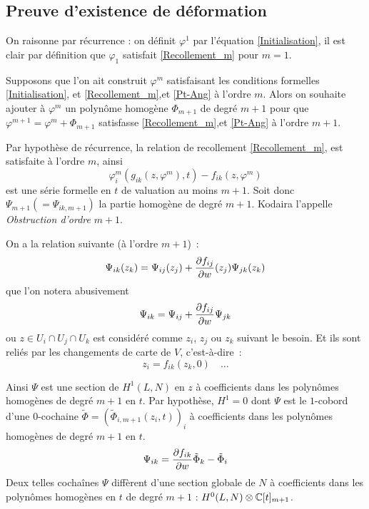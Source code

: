 \documentclass[a4paper,10pt,draft,makeidx,twocolumn]{amsart}
\begin{document}
\subsection{Preuve d'existence de déformation}
On raisonne par récurrence : on définit $\varphi^1$ par l'équation \eqref{Initialisation}, il est clair par définition que $\varphi_1$ satisfait \eqref{Recollement_m} pour $m=1$.

Supposons que l'on ait construit $\varphi^m$ satisfaisant les conditions formelles \eqref{Initialisation}, et \eqref{Recollement_m},et \eqref{Pt-Ang} à l'ordre $m$. Alors on souhaite ajouter à $\varphi^m$ un polynôme homogène $\Phi_{m+1}$ de degré $m+1$ pour que $\varphi^{m+1} = \varphi^m + \Phi_{m+1}$ satisfasse  \eqref{Recollement_m},et \eqref{Pt-Ang} à l'ordre $m+1$.

Par hypothèse de récurrence, la relation de recollement \eqref{Recollement_m}, est satisfaite à l'ordre $m$, ainsi
\begin{equation}
\varphi^m_i(g_{ik}(z,\varphi^m),t) - f_{ik}(z, \varphi^m)
\end{equation}
est une série formelle en $t$ de valuation au moins $m+1$. Soit donc $\Psi_{m+1} (=\Psi_{ik, m+1})$ la partie homogène de degré $m+1$. Kodaira l'appelle \emph{Obstruction d'ordre} $m+1$.

On a la relation suivante (à l'ordre $m+1$)~:
\begin{equation}
\Psi_{ik}(z_k) = \Psi_{ij}(z_j) + \dfrac{\partial{f_{ij}}}{\partial{w}}(z_j)\Psi_{jk}(z_k)
\end{equation}
que l'on notera abusivement
\begin{equation}
\Psi_{ik} = \Psi_{ij} + \dfrac{\partial{f_{ij}}}{\partial{w}}\Psi_{jk}
\end{equation}
ou $z \in U_i \cap U_j \cap U_k$ est considéré comme $z_i$, $z_j$ ou $z_k$ suivant le besoin. Et ils sont reliés par les changements de carte de $V$, c'est-à-dire~:
\begin{equation}
z_i = f_{ik}(z_k,0) \quad \dots
\end{equation}

Ainsi $\Psi$ est une section de $H^1(L,N)$ en $z$ à coefficients dans les polynômes homogènes de degré $m+1$ en $t$. Par hypothèse, $H^1 = 0$ dont $\Psi$ est le $1$-cobord  d'une $0$-cochaine $\tilde{\Phi} = (\tilde{\Phi}_{i,m+1}(z_i,t))_i$ à coefficients dans les polynômes homogènes de degré $m+1$ en $t$.
\begin{equation}\label{Cobord}
\Psi_{ik} = \dfrac{\partial{f_{ik}}}{\partial{w}}\tilde{\Phi}_k - \tilde\Phi_i
\end{equation}
Deux telles cochaînes $\Psi$ diffèrent d'une section globale de $N$ à coefficients dans les polynômes homogènes en $t$ de degré $m+1$ : $H^0(L,N) \otimes \mathbb{C}[t]_{m+1}$.
\end{document}
